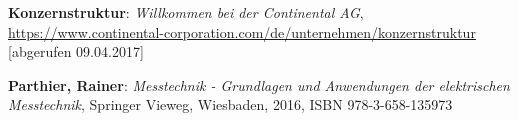 \setcounter{page}{\value{RomanPage}}

\makeatletter
\renewcommand*\bib@heading{%
	\section*{\bibname}%
	\addcontentsline{toc}{section}{\bibname}
	\@mkboth{\sectionmarkformat \bibname}{\sectionmarkformat \bibname}}
\makeatother
\ohead{}

\begin{thebibliography}{xx}
	
	\textbf{Konzernstruktur}: \textit{Willkommen bei der Continental AG}, \url{https://www.continental-corporation.com/de/unternehmen/konzernstruktur} [abgerufen 09.04.2017]
	
	\textbf{Parthier, Rainer}: \textit{Messtechnik - Grundlagen und Anwendungen der elektrischen Messtechnik}, Springer Vieweg, Wiesbaden, 2016, ISBN 978-3-658-135973
	
\end{thebibliography}
